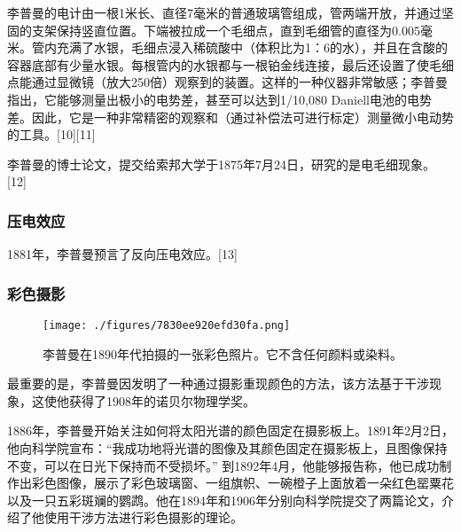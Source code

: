 李普曼的电计由一根1米长、直径7毫米的普通玻璃管组成，管两端开放，并通过坚固的支架保持竖直位置。下端被拉成一个毛细点，直到毛细管的直径为0.005毫米。管内充满了水银，毛细点浸入稀硫酸中（体积比为1：6的水），并且在含酸的容器底部有少量水银。每根管内的水银都与一根铂金线连接，最后还设置了使毛细点能通过显微镜（放大250倍）观察到的装置。这样的一种仪器非常敏感；李普曼指出，它能够测量出极小的电势差，甚至可以达到1/10,080 Daniell电池的电势差。因此，它是一种非常精密的观察和（通过补偿法可进行标定）测量微小电动势的工具。[10][11]

李普曼的博士论文，提交给索邦大学于1875年7月24日，研究的是电毛细现象。[12]
\subsubsection{压电效应}
1881年，李普曼预言了反向压电效应。[13]
\subsubsection{彩色摄影}
\begin{figure}[ht]
\centering
\texttt{[image: ./figures/7830ee920efd30fa.png]}
\caption{李普曼在1890年代拍摄的一张彩色照片。它不含任何颜料或染料。} \label{fig_LPM_4}
\end{figure}
最重要的是，李普曼因发明了一种通过摄影重现颜色的方法，该方法基于干涉现象，这使他获得了1908年的诺贝尔物理学奖。

1886年，李普曼开始关注如何将太阳光谱的颜色固定在摄影板上。1891年2月2日，他向科学院宣布：“我成功地将光谱的图像及其颜色固定在摄影板上，且图像保持不变，可以在日光下保持而不受损坏。” 到1892年4月，他能够报告称，他已成功制作出彩色图像，展示了彩色玻璃窗、一组旗帜、一碗橙子上面放着一朵红色罂粟花以及一只五彩斑斓的鹦鹉。他在1894年和1906年分别向科学院提交了两篇论文，介绍了他使用干涉方法进行彩色摄影的理论。